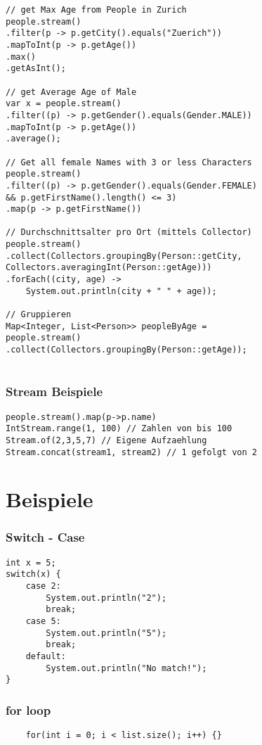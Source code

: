 \begin{multicols*}{5}
\begin{lstlisting}
// get Max Age from People in Zurich
people.stream()
.filter(p -> p.getCity().equals("Zuerich"))
.mapToInt(p -> p.getAge())
.max()
.getAsInt();

// get Average Age of Male
var x = people.stream()
.filter((p) -> p.getGender().equals(Gender.MALE))
.mapToInt(p -> p.getAge())
.average();

// Get all female Names with 3 or less Characters
people.stream()
.filter((p) -> p.getGender().equals(Gender.FEMALE) 
&& p.getFirstName().length() <= 3)
.map(p -> p.getFirstName())

// Durchschnittsalter pro Ort (mittels Collector)
people.stream()
.collect(Collectors.groupingBy(Person::getCity, Collectors.averagingInt(Person::getAge)))
.forEach((city, age) -> 
	System.out.println(city + " " + age));

// Gruppieren
Map<Integer, List<Person>> peopleByAge = 
people.stream()
.collect(Collectors.groupingBy(Person::getAge));
		
	\end{lstlisting}
	
	\subsubsection{Stream Beispiele}
	\begin{lstlisting}
people.stream().map(p->p.name)
IntStream.range(1, 100) // Zahlen von bis 100
Stream.of(2,3,5,7) // Eigene Aufzaehlung
Stream.concat(stream1, stream2) // 1 gefolgt von 2
	\end{lstlisting}


\section{Beispiele}

	\subsubsection{Switch - Case}
	\begin{lstlisting}
int x = 5; 
switch(x) {
	case 2: 
		System.out.println("2"); 
		break;
	case 5: 
		System.out.println("5"); 
		break;
	default: 
		System.out.println("No match!"); 
}
	\end{lstlisting}

	\subsubsection{for loop}
	\begin{lstlisting}
	for(int i = 0; i < list.size(); i++) {}
	

\end{lstlisting}
\end{multicols*}
